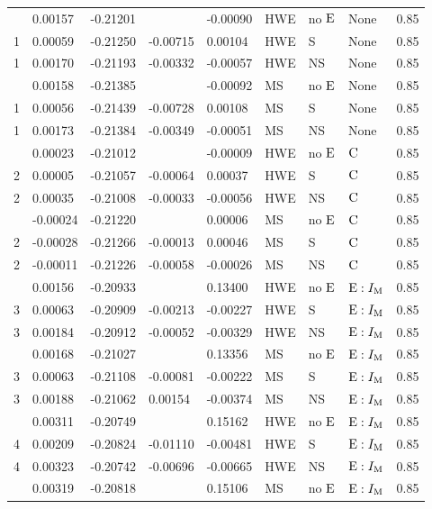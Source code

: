 \begin{longtable}[t]{lllllllll}
\endfoot
\bottomrule
\endlastfoot
1 & 0.00157 & -0.21201 &  & -0.00090 & HWE & no ${\rm E}$ & None & 0.85\\
1 & 0.00059 & -0.21250 & -0.00715 & 0.00104 & HWE & S & None & 0.85\\
1 & 0.00170 & -0.21193 & -0.00332 & -0.00057 & HWE & NS & None & 0.85\\
\addlinespace
1 & 0.00158 & -0.21385 &  & -0.00092 & MS & no ${\rm E}$ & None & 0.85\\
1 & 0.00056 & -0.21439 & -0.00728 & 0.00108 & MS & S & None & 0.85\\
1 & 0.00173 & -0.21384 & -0.00349 & -0.00051 & MS & NS & None & 0.85\\
\addlinespace
2 & 0.00023 & -0.21012 &  & -0.00009 & HWE & no ${\rm E}$ & ${\rm C}$ & 0.85\\
2 & 0.00005 & -0.21057 & -0.00064 & 0.00037 & HWE & S & ${\rm C}$ & 0.85\\
2 & 0.00035 & -0.21008 & -0.00033 & -0.00056 & HWE & NS & ${\rm C}$ & 0.85\\
\addlinespace
2 & -0.00024 & -0.21220 &  & 0.00006 & MS & no ${\rm E}$ & ${\rm C}$ & 0.85\\
2 & -0.00028 & -0.21266 & -0.00013 & 0.00046 & MS & S & ${\rm C}$ & 0.85\\
2 & -0.00011 & -0.21226 & -0.00058 & -0.00026 & MS & NS & ${\rm C}$ & 0.85\\
\addlinespace
3 & 0.00156 & -0.20933 &  & 0.13400 & HWE & no ${\rm E}$ & ${\rm E}:I_{{\rm M}}$ & 0.85\\
3 & 0.00063 & -0.20909 & -0.00213 & -0.00227 & HWE & S & ${\rm E}:I_{{\rm M}}$ & 0.85\\
3 & 0.00184 & -0.20912 & -0.00052 & -0.00329 & HWE & NS & ${\rm E}:I_{{\rm M}}$ & 0.85\\
\addlinespace
3 & 0.00168 & -0.21027 &  & 0.13356 & MS & no ${\rm E}$ & ${\rm E}:I_{{\rm M}}$ & 0.85\\
3 & 0.00063 & -0.21108 & -0.00081 & -0.00222 & MS & S & ${\rm E}:I_{{\rm M}}$ & 0.85\\
3 & 0.00188 & -0.21062 & 0.00154 & -0.00374 & MS & NS & ${\rm E}:I_{{\rm M}}$ & 0.85\\
\addlinespace
4 & 0.00311 & -0.20749 &  & 0.15162 & HWE & no ${\rm E}$ & ${\rm E}:I_{{\rm M}}$ & 0.85\\
4 & 0.00209 & -0.20824 & -0.01110 & -0.00481 & HWE & S & ${\rm E}:I_{{\rm M}}$ & 0.85\\
4 & 0.00323 & -0.20742 & -0.00696 & -0.00665 & HWE & NS & ${\rm E}:I_{{\rm M}}$ & 0.85\\
\addlinespace
4 & 0.00319 & -0.20818 &  & 0.15106 & MS & no ${\rm E}$ & ${\rm E}:I_{{\rm M}}$ & 0.85\\

\end{longtable}
